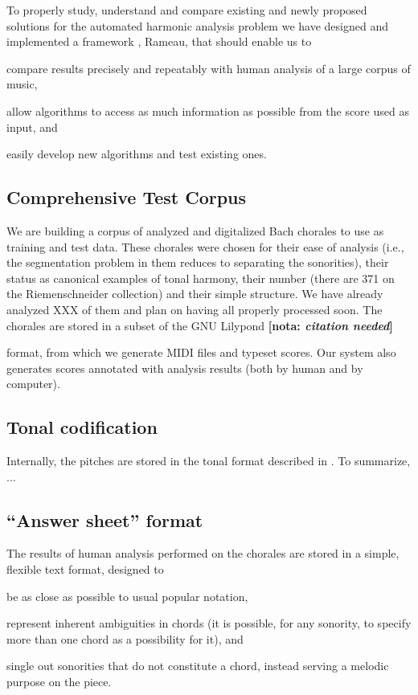 \documentclass{article}
\newcommand{\nota}[1]{
  \textbf{[nota: \textit{#1}]}
}
\begin{document}
To properly study, understand and compare existing and newly proposed
solutions for the automated harmonic analysis problem we have designed
and implemented a framework , Rameau, that should enable us to
\begin{list}{\textbf{.}}{}
\item compare results precisely and repeatably with human analysis of
  a large corpus of music,
\item allow algorithms to access as much information as possible from
  the score used as input, and
\item easily develop new algorithms and test existing ones.
\end{list}

\subsection{Comprehensive Test Corpus}
\label{sec:comprehensive-test-corpus}

We are building a corpus of analyzed and digitalized Bach chorales to
use as training and test data. These chorales were chosen for their
ease of analysis (i.e., the segmentation problem in them reduces to
separating the sonorities), their status as canonical examples of
tonal harmony, their number (there are 371 on the Riemenschneider
collection) and their simple structure. We have already analyzed XXX
of them and plan on having all properly processed soon. The chorales
are stored in a subset of the GNU Lilypond \nota{citation needed}
format, from which we generate MIDI files and typeset scores. Our
system also generates scores annotated with analysis results (both by
human and by computer).

\subsection{Tonal codification}
\label{sec:codificacao-jamary}

Internally, the pitches are stored in the tonal format described in
\cite{oliveira01:codificacao}. To summarize, ...


\subsection{``Answer sheet'' format}
\label{sec:formato-dos-acordes}

The results of human analysis performed on the chorales are stored in
a simple, flexible text format, designed to
\begin{list}{\textbf{.}}{}
\item be as close as possible to
usual popular notation,
\item represent inherent ambiguities in chords (it is possible, for
  any sonority, to specify more than one chord as a possibility for
  it), and
\item single out sonorities that do not constitute a chord, instead
  serving a melodic purpose on the piece.
\end{list}
\end{document}
